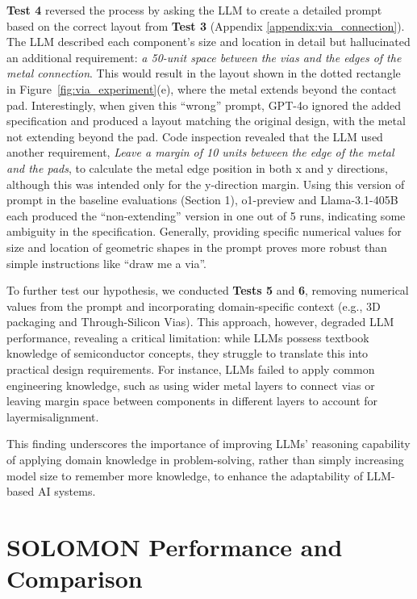 \documentclass{article}
\begin{document}
\textbf{Test 4} reversed the process by asking the LLM to create a detailed prompt based on the correct layout from \textbf{Test 3} (Appendix \ref{appendix:via_connection}). The LLM described each component's size and location in detail but hallucinated an additional requirement: \textit{a 50-unit space between the vias and the edges of the metal connection}. This would result in the layout shown in the dotted rectangle in Figure~\ref{fig:via_experiment}(e), where the metal extends beyond the contact pad. Interestingly, when given this ``wrong'' prompt, GPT-4o ignored the added specification and produced a layout matching the original design, with the metal not extending beyond the pad. Code inspection revealed that the LLM used another requirement, \textit{Leave a margin of 10 units between the edge of the metal and the pads}, to calculate the metal edge position in both x and y directions, although this was intended only for the y-direction margin. Using this version of prompt in the baseline evaluations (Section 1), o1-preview and Llama-3.1-405B each produced the ``non-extending'' version in one out of 5 runs, indicating some ambiguity in the specification. Generally, providing specific numerical values for size and location of geometric shapes in the prompt proves more robust than simple instructions like ``draw me a via''.

To further test our hypothesis, we conducted \textbf{Tests 5} and \textbf{6}, removing numerical values from the prompt and incorporating domain-specific context (e.g., 3D packaging and Through-Silicon Vias). This approach, however, degraded LLM performance, revealing a critical limitation: while LLMs possess textbook knowledge of semiconductor concepts, they struggle to translate this into practical design requirements. For instance, LLMs failed to apply common engineering knowledge, such as using wider metal layers to connect vias or leaving margin space between components in different layers to account for layermisalignment.

This finding underscores the importance of improving LLMs' reasoning capability of applying domain knowledge in problem-solving, rather than simply increasing model size to remember more knowledge, to enhance the adaptability of LLM-based AI systems.

\section{SOLOMON Performance and Comparison}
\end{document}
